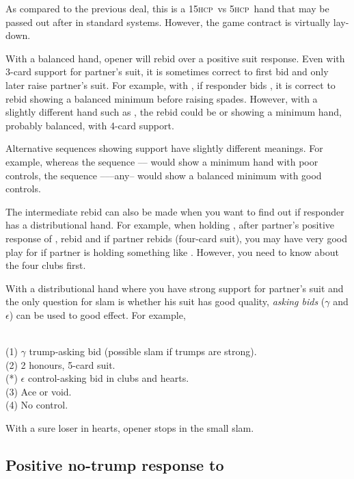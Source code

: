 \documentclass[a4paper,article,oneside]{memoir}
\newcommand{\gap}{\vspace{\baselineskip}}
\newcommand{\hcp}{\textsc{hcp}}
\begin{document}
As compared to the previous deal, this is a 15\hcp\ vs 5\hcp\ hand
that may be passed out after  in standard systems. However, the
game contract is virtually lay-down.

\gap
With a balanced hand, opener will rebid \nt{} over a positive suit
response.  Even with 3-card support for partner's suit, it is
sometimes correct to first bid \nt{} and only later raise partner's
suit. For example, with , if responder bids
, it is correct to rebid  showing a balanced minimum
before raising spades. However, with a slightly different hand such as
, the rebid could be  or  showing
a minimum hand, probably balanced, with 4-card support.

Alternative sequences showing support have slightly different
meanings.  For example, whereas the sequence ----
would show a minimum hand with poor controls, the sequence
------any-- would show a balanced minimum with
good controls.

The intermediate  rebid can also be made when you want to find
out if responder has a distributional hand. For example, when holding
, after partner's positive response of ,
rebid  and if partner rebids  (four-card suit), you may
have very good play for  if partner is holding something like
.  However, you need to know about the four
clubs first.

\gap
With a distributional hand where you have strong support for partner's
suit and the only question for slam is whether his suit has good
quality, \emph{asking bids} ($\gamma$ and $\epsilon$) can be used to
good effect. For example,

 \\
(1) $\gamma$ trump-asking bid (possible slam if trumps are strong). \\
(2) 2 honours, 5-card suit. \\ (*) $\epsilon$ control-asking bid in clubs and hearts. \\
(3) Ace or void. \\ (4) No control.

With a sure loser in hearts, opener stops in the small slam.

\subsection{Positive no-trump response to }
\end{document}
